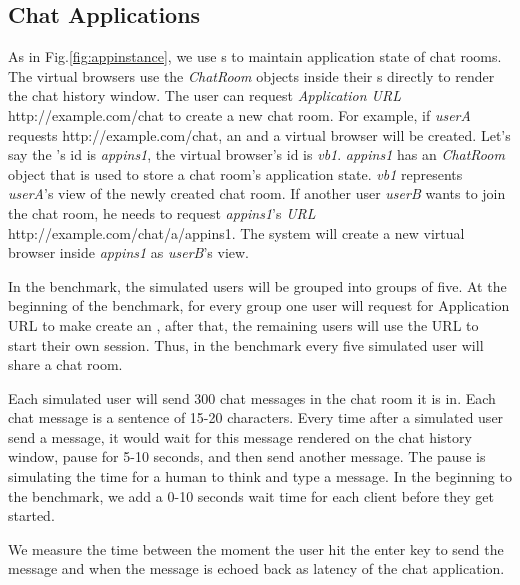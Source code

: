 \subsection{Chat Applications}
As in Fig.\ref{fig:appinstance},
we use \appins{}s to maintain application state of chat rooms.
The virtual browsers use the \emph{ChatRoom} objects inside their \appins{}s 
directly to render the chat history window.
The user can request \emph{Application URL} http://example.com/chat
to create a new chat room.
For example, if 
\emph{userA} requests http://example.com/chat,
an \appins{} and a virtual browser will be created.
Let's say the \appins{}'s id is \emph{appins1},
the virtual browser's id is \emph{vb1}.
\emph{appins1} has an \emph{ChatRoom} object that is used to store 
a chat room's application state.
\emph{vb1} represents \emph{userA}'s view of the newly created
chat room.
If another user \emph{userB} wants to join the chat room, 
he needs to request \emph{appins1}'s \emph{\appins{} URL} 
http://example.com/chat/a/appins1.
The system will create a new virtual browser inside \emph{appins1}
as \emph{userB}'s view.


In the benchmark, 
the simulated users will be grouped into groups of five.
At the beginning of the benchmark, 
for every group one user will request for Application URL to make 
\cb{} create an \appins{},
after that, the remaining users will use the \appins{} URL to start
their own session.
Thus, in the benchmark every five simulated user will share a chat room.

Each simulated user will send 300 chat messages in the chat room it is in.
Each chat message is a sentence of 15-20 characters.
Every time after a simulated user send a message,
it would wait for this message rendered on the chat history window,
pause for 5-10 seconds,
and then send another message.
The pause is simulating the time for a human to think and type a message.
In the beginning to the benchmark, 
we add a 0-10 seconds wait time for each client before they get started.

We measure the time between the moment 
the user hit the enter key to send the message and
when the message is echoed back as latency of the chat application.



